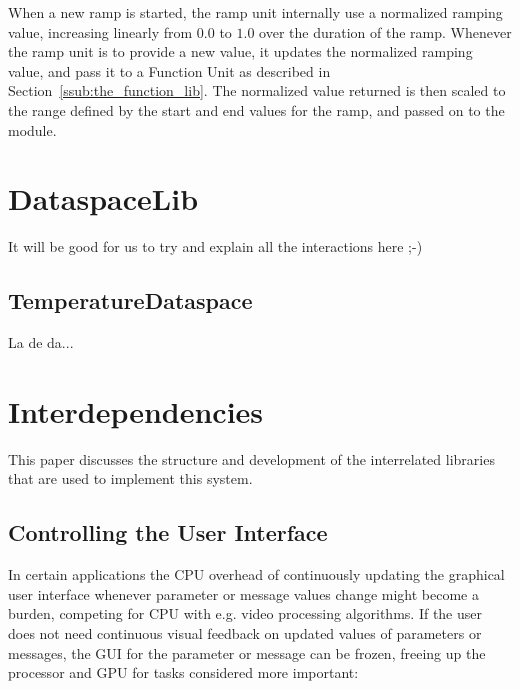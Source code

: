 \documentclass{article}
\begin{document}
When a new ramp is started, the ramp unit internally use a normalized ramping value, increasing linearly from $0.0$ to $1.0$ over the duration of the ramp. Whenever the ramp unit is to provide a new value, it updates the normalized ramping value, and pass it to a Function Unit as described in Section~\ref{ssub:the_function_lib}. The normalized value returned is then scaled to the range defined by the start and end values for the ramp, and passed on to the module.



\section{DataspaceLib}\label{sec:dataspacelib}

It will be good for us to try and explain all the interactions here ;-)

\subsection{TemperatureDataspace}\label{subsec:temperature_dataspace}

La de da...



\section{Interdependencies}\label{sec:interdependencies}

This paper discusses the structure and development of the interrelated libraries that are used to implement this system.



\subsection{Controlling the User Interface} %
\label{sub:controlling_the_user_interface}

In certain applications the CPU overhead of continuously updating the graphical user interface whenever parameter or message values change might become a burden, competing for CPU with e.g. video processing algorithms. If the user does not need continuous visual feedback on updated values of parameters or messages, the GUI for the parameter or message can be frozen, freeing up the processor and GPU for tasks considered more important:
\end{document}
